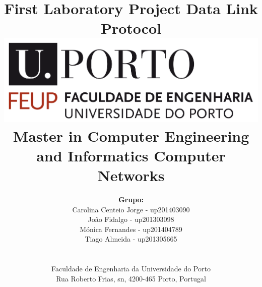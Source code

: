 \documentclass[a4paper]{article}
\begin{document}

\renewcommand{\figurename}{Fig.}

\setlength{\textwidth}{16cm}
\setlength{\textheight}{22cm}

\title{\Huge\textbf{First Laboratory Project}\linebreak\linebreak\linebreak
\Large\textbf{Data Link Protocol}\linebreak\linebreak
\linebreak\linebreak
\includegraphics[scale=0.1]{feup-logo.png}\linebreak\linebreak
\linebreak\linebreak
\Large{Master in Computer Engineering and Informatics} \linebreak\linebreak
\Large{Computer Networks}\linebreak
}

\author{\textbf{Grupo:}\\
Carolina Centeio Jorge - up201403090 \\
João Fidalgo - up201303098 \\
Mónica Fernandes - up201404789 \\
Tiago Almeida - up201305665 \\
\linebreak\linebreak \\
 \\ Faculdade de Engenharia da Universidade do Porto \\ Rua Roberto Frias, s\/n, 4200-465 Porto, Portugal \linebreak\linebreak\linebreak
\linebreak\linebreak\vspace{1cm}}
\end{document}

